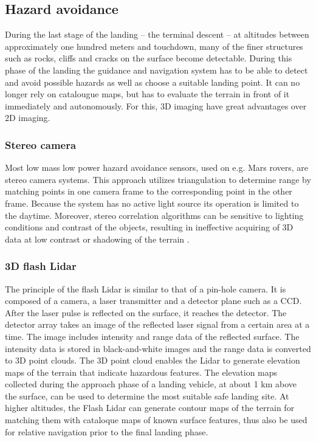 \subsection{Hazard avoidance}\label{sec:hazard_avoidance}

During the last stage of the landing – the terminal descent – at altitudes between approximately one hundred meters and touchdown, many of the finer structures such as rocks, cliffs and cracks on the surface become detectable. During this phase of the landing the guidance and navigation system has to be able to detect and avoid possible hazards as well as choose a suitable landing point. It can no longer rely on catalougue maps, but has to evaluate the terrain in front of it immediately and autonomously. For this, 3D imaging have great advantages over 2D imaging. 

\subsubsection{Stereo camera}
Most low mass low power hazard avoidance sensors, used on e.g. Mars rovers, are stereo camera systems. This approach utilizes triangulation to determine range by matching points in one camera frame to the corresponding point in the other frame. Because the system has no active light source its operation is limited to the daytime. Moreover, stereo correlation algorithms can be sensitive to lighting conditions and contrast of the objects, resulting in ineffective acquiring of 3D data at low contrast or shadowing of the terrain \cite{structuredlight}.

\subsubsection{3D flash Lidar}

The principle of the flash Lidar is similar to that of a pin-hole camera. It is composed of a camera, a laser transmitter and a detector plane such as a CCD. After the laser pulse is reflected on the surface, it reaches the detector. The detector array takes an image of the reflected laser signal from a certain area at a time. The image includes intensity and range data of the reflected surface. The intensity data is stored in black-and-white images and the range data is converted to 3D point clouds. The 3D point cloud enables the Lidar to generate elevation maps of the terrain that indicate hazardous features. The elevation maps collected during the approach phase of a landing vehicle, at about 1 km above the surface, can be used to determine the most suitable safe landing site. At higher altitudes, the Flash Lidar can generate contour maps of the terrain for matching them with cataloque maps of known surface features, thus also be used for relative navigation prior to the final landing phase.

